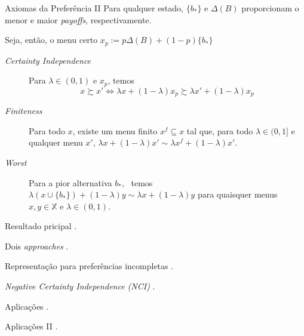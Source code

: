 \documentclass[11pt]{beamer}
\begin{document}
\begin{frame}{Axiomas da Preferência II}
Para qualquer estado, $\{b_*\}$ e $\Delta(B)$ proporcionam o menor e maior \emph{payoffs}, respectivamente.
 
\vspace{10pt}

Seja, então, o menu certo $x_p:=p\Delta(B)+(1-p)\{b_*\}$

\vspace{10pt}

\begin{description}
\item [\textit{Certainty Independence}] Para $\lambda\in (0,1)$ e $x_p$, temos $$x\succsim x' \Leftrightarrow \lambda x +(1-\lambda)x_p\succsim \lambda x' + (1-\lambda)x_p$$
\end{description}
\pause
\begin{description}
\item[\textit{Finiteness}] Para todo $x$, existe um menu finito $x^f\subseteq x$ tal que, para todo $\lambda\in (0,1]$ e qualquer menu $x'$, $\lambda x +(1-\lambda)x' \sim \lambda x^f +(1-\lambda)x'$.
\item[\textit{Worst}] Para a pior alternativa $b_*$, ~temos $\lambda\left(x\cup \{b_*\}\right)+(1-\lambda)y\sim \lambda x + (1-\lambda)y$ para quaisquer menus $x,y\in \mathbb{X}$ e $\lambda\in (0,1)$.
\end{description}

\end{frame}

\begin{frame}{Resultado pricipal}
.
\end{frame}

\begin{frame}{Dois \emph{approaches}}
.
\end{frame}

\begin{frame}{Representação para preferências incompletas}
.
\end{frame}

\begin{frame}{\emph{Negative Certainty Independence (NCI)}}
.
\end{frame}

\begin{frame}{Aplicações}
.
\end{frame}

\begin{frame}{Aplicações II}
.
\end{frame}
\end{document}
